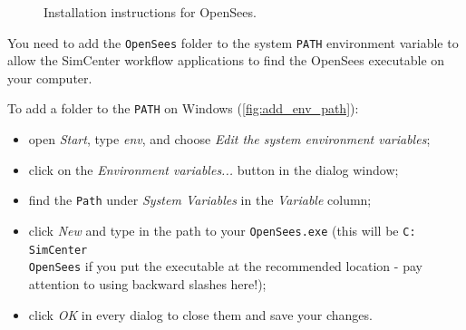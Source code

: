 \begin{figure}[!htbp]
  \caption{Installation instructions for OpenSees.}
  \label{fig:opensees_installation}
\end{figure}

You need to add the \texttt{OpenSees} folder to the system \texttt{PATH} environment variable to allow the SimCenter workflow applications to find the OpenSees executable on your computer. 

To add a folder to the \texttt{PATH} on Windows (\autoref{fig:add_env_path}):

\begin{itemize}
    \item open \emph{Start}, type \emph{env}, and choose \emph{Edit the system environment variables};
    \item click on the \emph{Environment variables...} button in the dialog window;
    \item find the \texttt{Path} under \emph{System Variables} in the \emph{Variable} column;
    \item click \emph{New} and type in the path to your \texttt{OpenSees.exe} (this will be \texttt{C:\\SimCenter\\OpenSees} if you put the executable at the recommended location - pay attention to using backward slashes here!);
    \item click \emph{OK} in every dialog to close them and save your changes.
\end{itemize}

